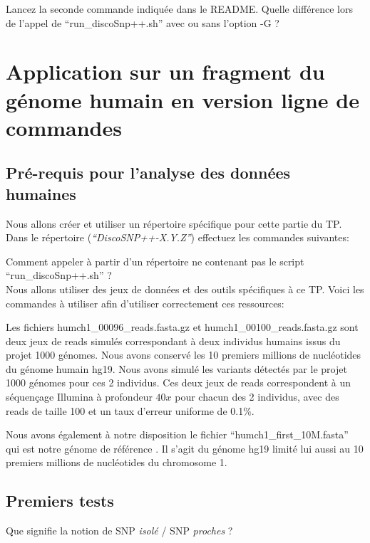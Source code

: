 \qu {} Lancez la seconde commande indiquée dans le README. Quelle différence lors de l'appel de ``run\_discoSnp++.sh'' avec ou sans l'option -G ?

\section*{Application sur un fragment du génome humain en version ligne de commandes}

\subsection*{Pré-requis pour l'analyse des données humaines}
Nous allons créer et utiliser un répertoire spécifique pour cette partie du TP. Dans le répertoire (\emph{``DiscoSNP++-X.Y.Z''}) effectuez les commandes suivantes:

\qu {} Comment appeler \discopp à partir d'un répertoire ne contenant pas le script ``run\_discoSnp++.sh'' ?\\

Nous allons utiliser des jeux de données et des outils spécifiques à ce TP. Voici les commandes à utiliser afin d'utiliser correctement ces ressources:
        
        
Les fichiers humch1\_00096\_reads.fasta.gz et humch1\_00100\_reads.fasta.gz sont deux jeux de reads simulés correspondant à deux individus humains issus du projet 1000 génomes.  Nous avons conservé les 10  premiers millions de nucléotides du génome humain hg19. Nous avons simulé les variants détectés par le projet 1000 génomes pour ces 2 individus. Ces deux jeux de reads correspondent à un séquençage Illumina à profondeur $40x$ pour chacun des 2 individus, avec des reads de taille 100 et un taux d'erreur uniforme de 0.1\%.



Nous avons également à notre disposition le fichier ``humch1\_first\_10M.fasta'' qui est notre génome de référence . Il s'agit du génome hg19 limité lui aussi au 10  premiers millions de nucléotides du chromosome 1.


\subsection*{Premiers tests}
\qu Que signifie la notion de SNP \emph{isolé} / SNP \emph{proches} ?


